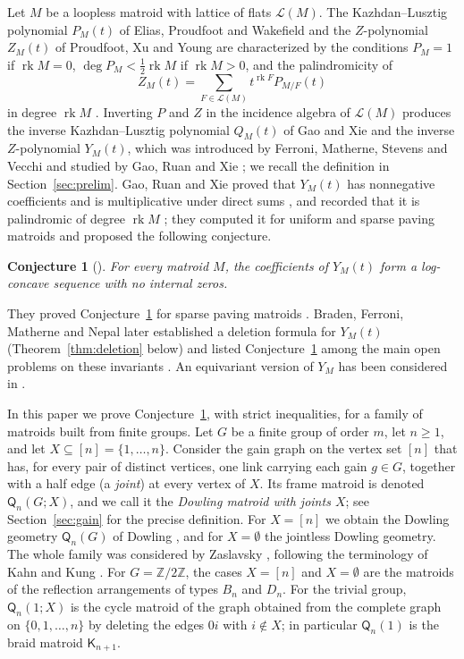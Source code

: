 \documentclass[11pt]{amsart}
\newtheorem{conjecture}[theorem]{Conjecture}
\theoremstyle{definition}
\theoremstyle{remark}
\numberwithin{equation}{section}
\newcommand{\Q}{\mathsf{Q}}
\newcommand{\K}{\mathsf{K}}
\newcommand{\rk}{\operatorname{rk}}
\newcommand{\cL}{\mathcal{L}}
\begin{document}
Let $M$ be a loopless matroid with lattice of flats $\cL(M)$. The Kazhdan--Lusztig polynomial $P_M(t)$ of Elias, Proudfoot and Wakefield \cite{EPW16} and the $Z$-polynomial $Z_M(t)$ of Proudfoot, Xu and Young \cite{PXY18} are characterized by the conditions $P_M=1$ if $\rk M=0$, $\deg P_M<\frac12\rk M$ if $\rk M>0$, and the palindromicity of
\[
Z_M(t)=\sum_{F\in\cL(M)}t^{\rk F}P_{M/F}(t)
\]
in degree $\rk M$ \cite{PXY18,BV20}. Inverting $P$ and $Z$ in the incidence algebra of $\cL(M)$ produces the inverse Kazhdan--Lusztig polynomial $Q_M(t)$ of Gao and Xie \cite{GX21} and the inverse $Z$-polynomial $Y_M(t)$, which was introduced by Ferroni, Matherne, Stevens and Vecchi \cite{FMSV24} and studied by Gao, Ruan and Xie \cite{GRX25}; we recall the definition in Section~\ref{sec:prelim}. Gao, Ruan and Xie proved that $Y_M(t)$ has nonnegative coefficients and is multiplicative under direct sums \cite[Propositions~2.1 and~2.3]{GRX25}, and recorded that it is palindromic of degree $\rk M$ \cite[Lemma~2.2]{GRX25}; they computed it for uniform and sparse paving matroids and proposed the following conjecture.

\begin{conjecture}[{\cite[Conjecture~1.5]{GRX25}}]\label{conj:GRX}
For every matroid $M$, the coefficients of $Y_M(t)$ form a log-concave sequence with no internal zeros.
\end{conjecture}

They proved Conjecture~\ref{conj:GRX} for sparse paving matroids \cite[Theorem~1.6]{GRX25}. Braden, Ferroni, Matherne and Nepal \cite{BFMN25} later established a deletion formula for $Y_M(t)$ (Theorem~\ref{thm:deletion} below) and listed Conjecture~\ref{conj:GRX} among the main open problems on these invariants \cite[Conjecture~1.2(d)]{BFMN25}. An equivariant version of $Y_M$ has been considered in \cite{GLX26}.

In this paper we prove Conjecture~\ref{conj:GRX}, with strict inequalities, for a family of matroids built from finite groups. Let $G$ be a finite group of order $m$, let $n\ge 1$, and let $X\subseteq[n]=\{1,\dots,n\}$. Consider the gain graph on the vertex set $[n]$ that has, for every pair of distinct vertices, one link carrying each gain $g\in G$, together with a half edge (a \emph{joint}) at every vertex of $X$. Its frame matroid is denoted $\Q_n(G;X)$, and we call it the \emph{Dowling matroid with joints $X$}; see Section~\ref{sec:gain} for the precise definition. For $X=[n]$ we obtain the Dowling geometry $\Q_n(G)$ of Dowling \cite{Dow73}, and for $X=\emptyset$ the jointless Dowling geometry. The whole family was considered by Zaslavsky \cite[Section~5.4, Example~2]{Zas22}, following the terminology of Kahn and Kung \cite{KK82}. For $G=\mathbb{Z}/2\mathbb{Z}$, the cases $X=[n]$ and $X=\emptyset$ are the matroids of the reflection arrangements of types $B_n$ and $D_n$. For the trivial group, $\Q_n(1;X)$ is the cycle matroid of the graph obtained from the complete graph on $\{0,1,\dots,n\}$ by deleting the edges $0i$ with $i\notin X$; in particular $\Q_n(1)$ is the braid matroid $\K_{n+1}$.
\end{document}
